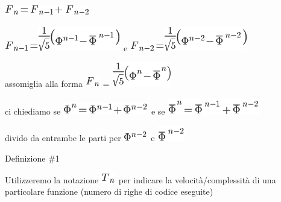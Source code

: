 \documentclass{article}
\begin{document}
\includegraphics{images/image14.png}{~}

\includegraphics{images/image15.png}\includegraphics{images/image16.png}{~e
}\includegraphics{images/image17.png}\includegraphics{images/image18.png}

{assomiglia alla forma }\includegraphics{images/image1.png}{~=
}\includegraphics{images/image4.png}{~}

{ci chiediamo se }\includegraphics{images/image19.png}{~e se
}\includegraphics{images/image20.png}

{divido da entrambe le parti per
}\includegraphics{images/image21.png}{~e
}\includegraphics{images/image22.png}

{Definizione \#1}

{Utilizzeremo la notazione }\includegraphics{images/image23.png}{~per
indicare la velocità/complessità di una particolare funzione (numero di
righe di codice eseguite) }
\end{document}
